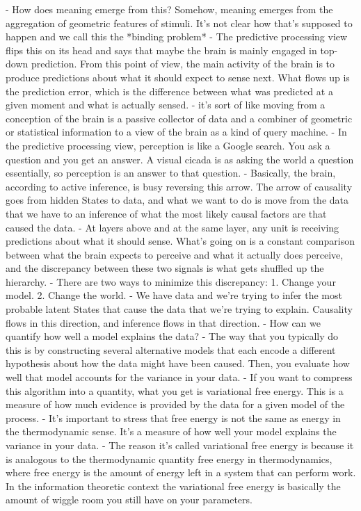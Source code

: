 - How does meaning emerge from this? Somehow, meaning emerges from the aggregation of geometric features of stimuli. It's not clear how that's supposed to happen and we call this the *binding problem*
- The predictive processing view flips this on its head and says that maybe the brain is mainly engaged in top-down prediction. From this point of view, the main activity of the brain is to produce predictions about what it should expect to sense next. What flows up is the prediction error, which is the difference between what was predicted at a given moment and what is actually sensed.
- it's sort of like moving from a conception of the brain is a passive collector of data and a combiner of geometric or statistical information to a view of the brain as a kind of query machine.
- In the predictive processing view, perception is like a Google search. You ask a question and you get an answer. A visual cicada is as asking the world a question essentially, so perception is an answer to that question.
- Basically, the brain, according to active inference, is busy reversing this arrow. The arrow of causality goes from hidden States to data, and what we want to do is move from the data that we have to an inference of what the most likely causal factors are that caused the data.
- At layers above and at the same layer, any unit is receiving predictions about what it should sense. What's going on is a constant comparison between what the brain expects to perceive and what it actually does perceive, and the discrepancy between these two signals is what gets shuffled up the hierarchy.
- There are two ways to minimize this discrepancy:
	1. Change your model.
	2. Change the world.
- We have data and we're trying to infer the most probable latent States that cause the data that we're trying to explain. Causality flows in this direction, and inference flows in that direction.
- How can we quantify how well a model explains the data?
- The way that you typically do this is by constructing several alternative models that each encode a different hypothesis about how the data might have been caused. Then, you evaluate how well that model accounts for the variance in your data.
- If you want to compress this algorithm into a quantity, what you get is variational free energy. This is a measure of how much evidence is provided by the data for a given model of the process.
- It's important to stress that free energy is not the same as energy in the thermodynamic sense. It's a measure of how well your model explains the variance in your data.
- The reason it's called variational free energy is because it is analogous to the thermodynamic quantity free energy in thermodynamics, where free energy is the amount of energy left in a system that can perform work. In the information theoretic context the variational free energy is basically the amount of wiggle room you still have on your parameters.
